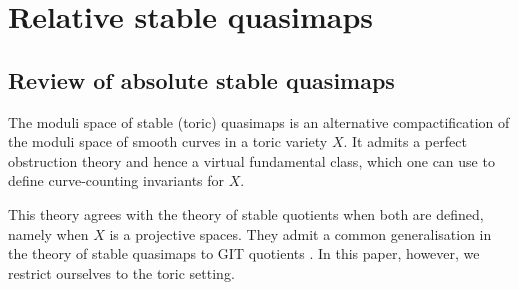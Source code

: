 \section{Relative stable quasimaps}

\subsection{Review of absolute stable quasimaps}
The moduli space of stable (toric) quasimaps is an alternative compactification of the moduli space of smooth curves in a toric variety $X$. It admits a perfect obstruction theory and hence a virtual fundamental class, which one can use to define curve-counting invariants for $X$.

This theory agrees with the theory of stable quotients \cite{MOP} when both are defined, namely when $X$ is a projective spaces. They admit a common generalisation in the theory of stable quasimaps to GIT quotients \cite{CFKM}. In this paper, however, we restrict ourselves to the toric setting.

